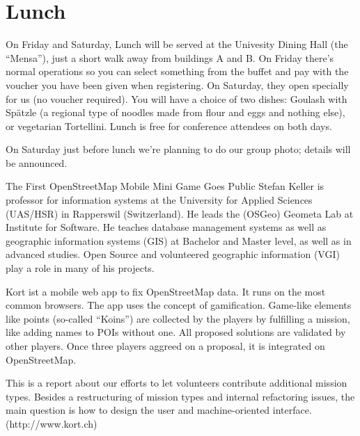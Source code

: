 \ClearWallPaper

\cropmarkswallpaper

\newpage
{}
\thispagestyle{empty}
\section*{Lunch}

On Friday and Saturday, Lunch will be served at the Univesity Dining Hall
(the ``Mensa''), just a short walk away from buildings A and B. 
On Friday there's normal operations so you can select something from 
the buffet and pay with the voucher you have been given when registering. 
On Saturday, they open specially for us (no voucher required). You will have a 
choice of two dishes: Goulash with Spätzle (a regional type of noodles made 
from flour and eggs and nothing else), or vegetarian Tortellini.
Lunch is free for conference attendees on both days.

On Saturday just before lunch we're planning to do our group photo; 
details will be announced.
\cropmarkswallpaper

%
{The First OpenStreetMap Mobile Mini Game Goes Public}%
{Stefan Keller is professor for information systems at the University for Applied Sciences (UAS/HSR) in Rapperswil (Switzerland). He leads the (OSGeo) Geometa Lab at Institute for Software. He teaches database management systems as well as geographic information systems (GIS) at Bachelor and Master level, as well as in advanced studies. Open Source and volunteered geographic information (VGI) play a role in many of his projects. }%
{Kort ist a mobile web app to fix OpenStreetMap data. It runs on the most common browsers. The app uses the concept of gamification. Game-like elements like points (so-called ``Koins'') are collected by the players by fulfilling a mission, like adding names to POIs without one. All proposed solutions are validated by other players. Once three players aggreed on a proposal, it is integrated on OpenStreetMap.

This is a report about our efforts to let volunteers contribute additional mission types. Besides a restructuring of mission types and internal refactoring issues, the main question is how to design the user and machine-oriented interface. (http://www.kort.ch)}


